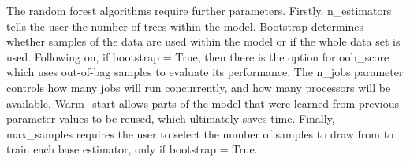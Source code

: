 \documentclass[../thesis.tex]{subfiles}
\begin{document}
The random forest algorithms require further parameters. Firstly, n\_estimators tells the user the number of trees within the model. Bootstrap determines whether samples of the data are used within the model or if the whole data set is used. Following on, if bootstrap = True, then there is the option for oob\_score which uses out-of-bag samples to evaluate its performance. The n\_jobs parameter controls how many jobs will run concurrently, and how many processors will be available. Warm\_start allows parts of the model that were learned from previous parameter values to be reused, which ultimately saves time. Finally, max\_samples requires the user to select the number of samples to draw from to train each base estimator, only if bootstrap = True.

\newpage
\begin{landscape}
\begin{table}[hbt!]
    \centering{}
\end{table}
\end{landscape}
\end{document}
